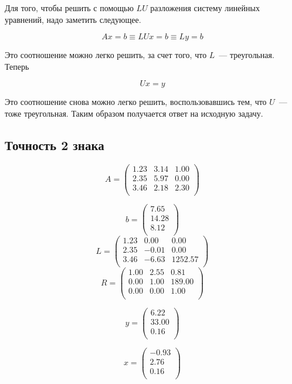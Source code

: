 \documentclass[11pt,a4paper,oneside]{article}
\begin{document}
Для того, чтобы решить с помощью $LU$ разложения систему линейных уравнений, надо заметить следующее.

$$ Ax = b \equiv LUx = b \equiv Ly = b $$

Это соотношение можно легко решить, за счет того, что $L$~--- треугольная. Теперь

$$ Ux = y $$

Это соотношение снова можно легко решить, воспользовавшись тем, что $U$~--- тоже треугольная. Таким образом получается ответ на исходную задачу.
	
\subsection{Точность 2 знака}

$$ A = \left(\begin{matrix}
	1.23 & 3.14 & 1.00 \\
	2.35 & 5.97 & 0.00 \\
	3.46 & 2.18 & 2.30 \\
\end{matrix}\right) $$

$$ b = \left(\begin{matrix}
	7.65 \\
	14.28 \\
	8.12 \\
\end{matrix}\right) $$
$$ L = \left(\begin{matrix}
	1.23 & 0.00 & 0.00 \\
	2.35 & -0.01 & 0.00 \\
	3.46 & -6.63 & 1252.57 \\
\end{matrix}\right) $$
$$ R = \left(\begin{matrix}
	1.00 & 2.55 & 0.81 \\
	0.00 & 1.00 & 189.00 \\
	0.00 & 0.00 & 1.00 \\
\end{matrix}\right) $$

$$ y = \left(\begin{matrix}
	6.22 \\
	33.00 \\
	0.16 \\
\end{matrix}\right) $$

$$ x = \left(\begin{matrix}
	-0.93 \\
	2.76 \\
	0.16 \\
\end{matrix}\right) $$
\end{document}
